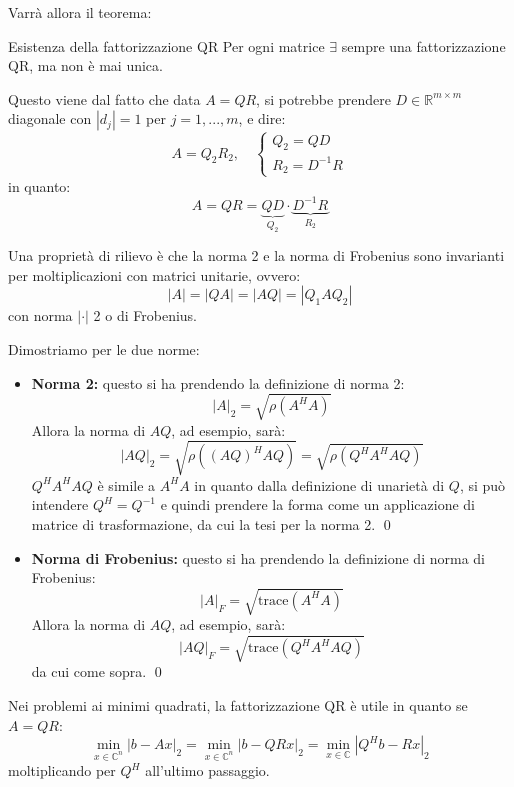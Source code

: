 \documentclass[a4paper,11pt]{article}
\begin{document}
Varrà allora il teorema:
\begin{theorem}{Esistenza della fattorizzazione QR}
	Per ogni matrice $\exists$ sempre una fattorizzazione QR, ma non è mai unica.
\end{theorem}

Questo viene dal fatto che data $A = QR$, si potrebbe prendere $D \in \mathbb{R}^{m \times m}$ diagonale con $|d_j| = 1$ per $j = 1, ..., m$, e dire:
$$
A = Q_2 R_2, \quad
	\begin{cases}
		Q_2 = QD \\
		R_2 = D^{-1} R
	\end{cases}
$$
in quanto:
$$
A = QR =  \underbrace{QD}_{Q_2} \cdot \underbrace{D^{-1}R}_{R_2}
$$

\par\smallskip

Una proprietà di rilievo è che la norma 2 e la norma di Frobenius sono invarianti per moltiplicazioni con matrici unitarie, ovvero:
$$
|A| = |QA| = |AQ| = |Q_1 A Q_2|
$$
con norma $|\cdot |$ 2 o di Frobenius.

Dimostriamo per le due norme:
\begin{itemize}
	\item \textbf{Norma 2:} 
questo si ha prendendo la definizione di norma 2:
$$
|A|_2 = \sqrt{\rho(A^H A)}
$$
Allora la norma di $AQ$, ad esempio, sarà:
$$
|AQ|_2 = \sqrt{\rho( (AQ)^H AQ )} = \sqrt{\rho(Q^H A^H A Q)}
$$
$Q^H A^H A Q$ è simile a $A^H A$ in quanto dalla definizione di unarietà di $Q$, si può intendere $Q^H = Q^{-1}$ e quindi prendere la forma come un applicazione di matrice di trasformazione, da cui la tesi per la norma 2. \qed

	\item \textbf{Norma di Frobenius:}
questo si ha prendendo la definizione di norma di Frobenius:
$$
|A|_F = \sqrt{\mathrm{trace}(A^H A)}
$$
Allora la norma di $AQ$, ad esempio, sarà:
$$
|AQ|_F = \sqrt{\mathrm{trace}(Q^H A^H A Q)} 
$$
da cui come sopra. \qed
\end{itemize}

\par\smallskip

Nei problemi ai minimi quadrati, la fattorizzazione QR è utile in quanto se $A = QR$:
$$
\min_{x \in \mathbb{C}^n} | b - Ax |_2 = \min_{x \in \mathbb{C}^n} |b - QR x|_2 = \min_{x \in \mathbb{C}} |Q^H b - Rx|_2
$$
moltiplicando per $Q^H$ all'ultimo passaggio.
\end{document}
